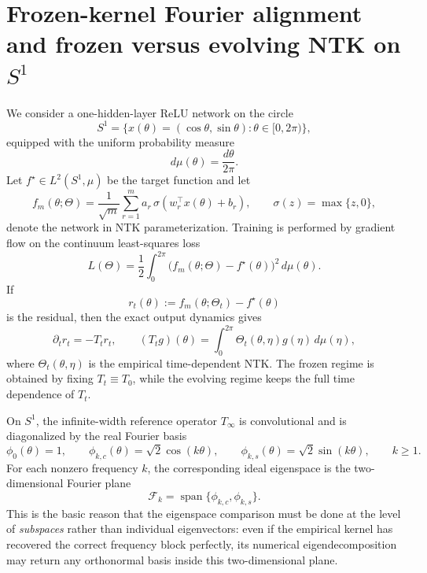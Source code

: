 \documentclass[11pt]{article}
\title{}
\author{Shreyas Kalvankar}
\date{\today}
\begin{document}
\maketitle

\section{Frozen-kernel Fourier alignment and frozen versus evolving NTK on \(S^1\)}

We consider a one-hidden-layer ReLU network on the circle
\[
	S^1=\{x(\theta)=(\cos\theta,\sin\theta):\theta\in[0,2\pi)\},
\]
equipped with the uniform probability measure
\[
	d\mu(\theta)=\frac{d\theta}{2\pi}.
\]
Let \(f^\star\in L^2(S^1,\mu)\) be the target function and let
\[
	f_m(\theta;\Theta)=\frac{1}{\sqrt m}\sum_{r=1}^m a_r\,\sigma(w_r^\top x(\theta)+b_r),
	\qquad
	\sigma(z)=\max\{z,0\},
\]
denote the network in NTK parameterization. Training is performed by gradient flow on the continuum least-squares loss
\[
	L(\Theta)=\frac12\int_0^{2\pi}\bigl(f_m(\theta;\Theta)-f^\star(\theta)\bigr)^2\,d\mu(\theta).
\]
If
\[
	r_t(\theta):=f_m(\theta;\Theta_t)-f^\star(\theta)
\]
is the residual, then the exact output dynamics gives
\[
	\partial_t r_t=-T_t r_t,
	\qquad
	(T_t g)(\theta)=\int_0^{2\pi}\Theta_t(\theta,\eta)g(\eta)\,d\mu(\eta),
\]
where \(\Theta_t(\theta,\eta)\) is the empirical time-dependent NTK. The frozen regime is obtained by fixing \(T_t\equiv T_0\), while the evolving regime keeps the full time dependence of \(T_t\).

On \(S^1\), the infinite-width reference operator \(T_\infty\) is convolutional and is diagonalized by the real Fourier basis
\[
	\phi_0(\theta)=1,\qquad
	\phi_{k,c}(\theta)=\sqrt2\cos(k\theta),\qquad
	\phi_{k,s}(\theta)=\sqrt2\sin(k\theta),\qquad k\ge 1.
\]
For each nonzero frequency \(k\), the corresponding ideal eigenspace is the two-dimensional Fourier plane
\[
	\mathcal F_k=\operatorname{span}\{\phi_{k,c},\phi_{k,s}\}.
\]
This is the basic reason that the eigenspace comparison must be done at the level of \emph{subspaces} rather than individual eigenvectors: even if the empirical kernel has recovered the correct frequency block perfectly, its numerical eigendecomposition may return any orthonormal basis inside this two-dimensional plane.
\end{document}
